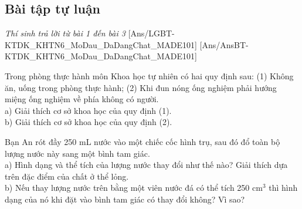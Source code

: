 \documentclass[FileMain.tex]{subfiles}
\begin{document}
\subsection{Bài tập tự luận}\textit{\large Thí sinh trả lời từ bài 1 đến bài 3}
[Ans/LGBT-KTDK_KHTN6_MoDau_DaDangChat_MADE101]
[Ans/AnsBT-KTDK_KHTN6_MoDau_DaDangChat_MADE101]
\begin{bt}%
Trong phòng thực hành môn Khoa học tự nhiên có hai quy định sau: (1) Không ăn, uống trong phòng thực hành; (2) Khi đun nóng ống nghiệm phải hướng miệng ống nghiệm về phía không có người.\\
a) Giải thích cơ sở khoa học của quy định (1).\\
b) Giải thích cơ sở khoa học của quy định (2).
\end{bt}

\begin{bt}%
Bạn An rót đầy 250 mL nước vào một chiếc cốc hình trụ, sau đó đổ toàn bộ lượng nước này sang một bình tam giác.\\
a) Hình dạng và thể tích của lượng nước thay đổi như thế nào? Giải thích dựa trên đặc điểm của chất ở thể lỏng.\\
b) Nếu thay lượng nước trên bằng một viên nước đá có thể tích 250 cm$^3$ thì hình dạng của nó khi đặt vào bình tam giác có thay đổi không? Vì sao?
\end{bt}
\end{document}
